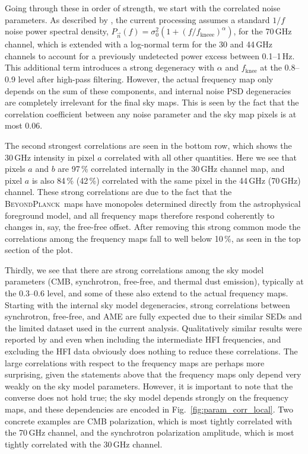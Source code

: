 \documentclass[twocolumn]{aa}
\newcommand{\n}[0]{\vec{n}}
\newcommand{\BP}{\textsc{BeyondPlanck}}
\begin{document}
Going through these in order of strength, we start with the correlated
noise parameters. As described by \citet{bp06}, the current processing
assumes a standard $1/f$ noise power spectral density,
$P_{\n}(f)=\sigma_0^2 (1+(f/f_\mathrm{kneee})^\alpha)$, for the
70\,GHz channel, which is extended with a log-normal term for the 30
and 44\,GHz channels to account for a previously undetected power excess between
0.1--1\,Hz. This additional term introduces a strong degeneracy with
$\alpha$ and $f_{\mathrm{knee}}$ at the 0.8--0.9 level after high-pass
filtering. However, the actual frequency map only depends on the sum
of these components, and internal noise PSD degeneracies are
completely irrelevant for the final sky maps. This is seen by the fact
that the correlation coefficient between any noise parameter and the
sky map pixels is at most 0.06.

The second strongest correlations are seen in the bottom row, which
shows the 30\,GHz intensity in pixel $a$ correlated with all other
quantities. Here we see that pixels $a$ and $b$ are 97\,\% correlated
internally in the 30\,GHz channel map, and pixel $a$ is also 84\,\%
(42\,\%) correlated with the same pixel in the 44\,GHz (70\,GHz)
channel. These strong correlations are due to the fact that the
\BP\ maps have monopoles determined directly from the astrophysical
foreground model, and all frequency maps therefore respond coherently
to changes in, say, the free-free offset. After removing this strong
common mode the correlations among the frequency maps fall to well
below 10\,\%, as seen in the top section of the plot.

Thirdly, we see that there are strong correlations among the sky model
parameters (CMB, synchrotron, free-free, and thermal dust emission),
typically at the 0.3--0.6 level, and some of these also extend to the
actual frequency maps. Starting with the internal sky model
degeneracies, strong correlations between synchrotron, free-free, and
AME are fully expected due to their similar SEDs and the limited
dataset used in the current analysis. Qualitatively similar results
were reported by \citet{planck2014-a12} and \citet{planck2014-a31}
even when including the intermediate HFI frequencies, and excluding
the HFI data obviously does nothing to reduce these correlations. The
large correlations with respect to the frequency maps are perhaps more
surprising, given the statements above that the frequency maps only
depend very weakly on the sky model parameters. However, it is
important to note that the converse does not hold true; the
sky model depends strongly on the frequency maps, and these
dependencies are encoded in Fig.~\ref{fig:param_corr_local}. Two
concrete examples are CMB polarization, which is most tightly
correlated with the 70\,GHz channel, and the synchrotron polarization
amplitude, which is most tightly correlated with the 30\,GHz channel.
\end{document}
